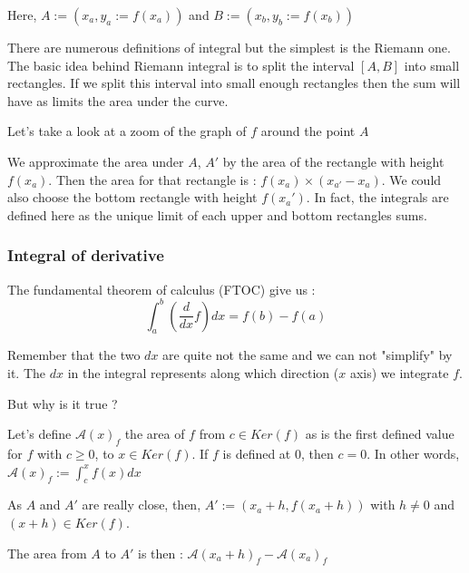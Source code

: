 \documentclass[12pt]{article}
\begin{document}
\begin{figure}[H]
 \centering
 
\end{figure}

Here, $A := (x_a, y_a:=f(x_a))$ and $B := (x_b, y_b:=f(x_b))$

There are numerous definitions of integral but the simplest is the Riemann \cite{wiki_riemann_integral} one. The basic idea behind Riemann integral is to split the interval $[A, B]$ into small rectangles. If we split this interval into small enough rectangles then the sum will have as limits the area under the curve.

Let's take a look at a zoom of the graph of $f$ around the point $A$


\begin{figure}[H]
 \centering
 
\end{figure}


We approximate the area under $A$, $A'$ by the area of the rectangle with height $f(x_a)$. Then the area for that rectangle is : $f(x_a) \times (x_{a'} - x_a)$. We could also choose the bottom rectangle with height $f(x_a')$. In fact, the integrals are defined here as the unique limit of each upper and bottom rectangles sums.

\subsubsection{Integral of derivative}

The fundamental theorem of calculus (FTOC) \cite{wiki_fundamental_theorem_calculus} give us : 
$$ \int_a^b (\frac{d}{dx}f)dx = f(b) - f(a) $$

Remember that the two $dx$ are quite not the same and we can not "simplify" by it. The $dx$ in the integral represents along which direction ($x$ axis) we integrate $f$.

But why is it true ?

Let's define $\mathcal{A}(x)_f$ the area of $f$ from $c \in Ker(f)$ as is the first defined value for $f$ with $c \geq 0$, to $x \in Ker(f)$. If $f$ is defined at $0$, then $c=0$. In other words, $\mathcal{A}(x)_f := \int_c^{x}f(x)dx$

As $A$ and $A'$ are really close, then, $A' := (x_a+h, f(x_a+h))$ with $h \neq 0$ and $(x+h) \in Ker(f)$.

The area from $A$ to $A'$ is then : $\mathcal{A}(x_a+h)_f - \mathcal{A}(x_a)_f$
\end{document}
